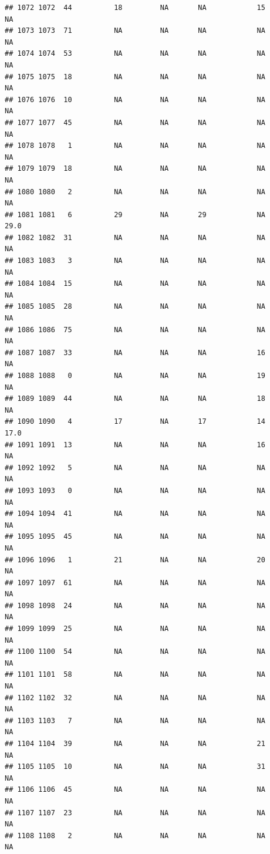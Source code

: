 \documentclass[man]{apa6}
\begin{document}
\begin{verbatim}
## 1072 1072  44          18         NA       NA            15       NA
## 1073 1073  71          NA         NA       NA            NA       NA
## 1074 1074  53          NA         NA       NA            NA       NA
## 1075 1075  18          NA         NA       NA            NA       NA
## 1076 1076  10          NA         NA       NA            NA       NA
## 1077 1077  45          NA         NA       NA            NA       NA
## 1078 1078   1          NA         NA       NA            NA       NA
## 1079 1079  18          NA         NA       NA            NA       NA
## 1080 1080   2          NA         NA       NA            NA       NA
## 1081 1081   6          29         NA       29            NA     29.0
## 1082 1082  31          NA         NA       NA            NA       NA
## 1083 1083   3          NA         NA       NA            NA       NA
## 1084 1084  15          NA         NA       NA            NA       NA
## 1085 1085  28          NA         NA       NA            NA       NA
## 1086 1086  75          NA         NA       NA            NA       NA
## 1087 1087  33          NA         NA       NA            16       NA
## 1088 1088   0          NA         NA       NA            19       NA
## 1089 1089  44          NA         NA       NA            18       NA
## 1090 1090   4          17         NA       17            14     17.0
## 1091 1091  13          NA         NA       NA            16       NA
## 1092 1092   5          NA         NA       NA            NA       NA
## 1093 1093   0          NA         NA       NA            NA       NA
## 1094 1094  41          NA         NA       NA            NA       NA
## 1095 1095  45          NA         NA       NA            NA       NA
## 1096 1096   1          21         NA       NA            20       NA
## 1097 1097  61          NA         NA       NA            NA       NA
## 1098 1098  24          NA         NA       NA            NA       NA
## 1099 1099  25          NA         NA       NA            NA       NA
## 1100 1100  54          NA         NA       NA            NA       NA
## 1101 1101  58          NA         NA       NA            NA       NA
## 1102 1102  32          NA         NA       NA            NA       NA
## 1103 1103   7          NA         NA       NA            NA       NA
## 1104 1104  39          NA         NA       NA            21       NA
## 1105 1105  10          NA         NA       NA            31       NA
## 1106 1106  45          NA         NA       NA            NA       NA
## 1107 1107  23          NA         NA       NA            NA       NA
## 1108 1108   2          NA         NA       NA            NA       NA

\end{verbatim}
\end{document}

